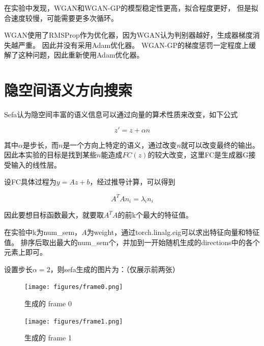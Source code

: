\documentclass{article}
\begin{document}
在实验中发现，WGAN和WGAN-GP的模型稳定性更高，拟合程度更好，
但是拟合速度较慢，可能需要更多次循环。

WGAN使用了RMSProp作为优化器，因为WGAN认为判别器越好，生成器梯度消失越严重。
因此并没有采用Adam优化器。
WGAN-GP的梯度惩罚一定程度上缓解了这种问题，因此重新使用Adam优化器。

\section{隐空间语义方向搜索}

Sefa认为隐空间丰富的语义信息可以通过向量的算术性质来改变，如下公式

\begin{equation}
    z' = z + \alpha n
\end{equation}

其中$\alpha$是步长，而$n$是一个方向上特定的语义，通过改变$n$就可以改变最终的输出。
因此本实验的目标是找到某些$n$能造成$FC(z)$的较大改变，这里FC是生成器G接受输入的线性层。

设FC具体过程为$y=Az+b$，经过推导计算，可以得到

\begin{equation}
    A^T A n_i = \lambda_i n_i
\end{equation}

因此要想目标函数最大，就要取$A^T A$的前k个最大的特征值。

在实验中k为num\_sem，$A$为weight，通过torch.linalg.eig可以求出特征向量和特征值。
排序后取出最大的num\_sem个，并加到一开始随机生成的directions中的各个元素上即可。

设置步长$\alpha=2$，则sefa生成的图片为：（仅展示前两张）

\begin{figure}[H]
    \centering
    \texttt{[image: figures/frame0.png]}
    \caption{生成的 frame 0}
\end{figure}

\begin{figure}[H]
    \centering
    \texttt{[image: figures/frame1.png]}
    \caption{生成的 frame 1}
\end{figure}
\end{document}
